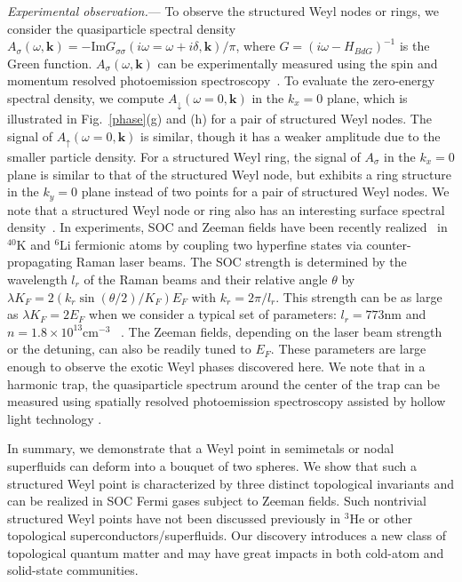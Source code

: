 \documentclass[prl,aps,twocolumn,showpacs,floatfix]{revtex4}
\begin{document}
\emph{Experimental observation.}--- To observe the structured Weyl nodes or
rings, we consider the quasiparticle spectral density $A_{\sigma }(\omega ,%
\bm{k})=-\mathrm{Im}G_{\sigma \sigma }(i\omega =\omega +i\delta ,\bm{k})/\pi
$, where $G=(i\omega -H_{BdG})^{-1}$ is the Green function. $A_{\sigma
}(\omega ,\bm{k})$ can be experimentally measured using the spin and
momentum resolved photoemission spectroscopy~\cite{Jin08Nature}. To evaluate
the zero-energy spectral density, we compute $A_{\downarrow }(\omega =0,%
\bm{k})$ in the $k_{x}=0$ plane, which is illustrated in Fig.~\ref{phase}(g)
and (h) for a pair of structured Weyl nodes. The signal of $A_{\uparrow
}(\omega =0,\bm{k})$ is similar, though it has a weaker amplitude due to the
smaller particle density. For a structured Weyl ring, the signal of $%
A_{\sigma }$ in the $k_{x}=0$ plane is similar to that of the structured
Weyl node, but exhibits a ring structure in the $k_{y}=0$ plane instead of
two points for a pair of structured Weyl nodes. We note that a structured
Weyl node or ring also has an interesting surface spectral density~\cite%
{Yang2014PRL}. In experiments, SOC and Zeeman fields have been recently
realized~\cite{Lin2011Nature,Jing2012PRL,
Zwierlen2012PRL,PanJian2012PRL,Qu2013PRA,Spilman2013PRL,
Spilman2013NatRev,Jing2014Review,Jing2015arXiv} in $^{40}$K and $^{6}$Li
fermionic atoms by coupling two hyperfine states via counter-propagating
Raman laser beams. The SOC strength is determined by the wavelength $l_{r}$
of the Raman beams and their relative angle $\theta $ by $\lambda
K_{F}=2(k_{r}\sin (\theta /2)/K_{F})E_{F}$ with $k_{r}=2\pi /l_{r}$. This
strength can be as large as $\lambda K_{F}=2E_{F}$ when we consider a
typical set of parameters: $l_{r}=773$nm and $n=1.8\times 10^{13}$cm$^{-3}$~%
\cite{Jing2012PRL}. The Zeeman fields, depending on the laser beam strength
or the detuning, can also be readily tuned to $E_{F}$. These parameters are
large enough to observe the exotic Weyl phases discovered here. We note that
in a harmonic trap, the quasiparticle spectrum around the center of the trap
can be measured using spatially resolved photoemission spectroscopy assisted
by hollow light technology \cite{GaeblerThesis}.

In summary, we demonstrate that a Weyl point in semimetals or nodal
superfluids can deform into a bouquet of two spheres. We show that such a
structured Weyl point is characterized by three distinct topological
invariants and can be realized in SOC Fermi gases subject to Zeeman fields.
Such nontrivial structured Weyl points have not been discussed previously in
$^{3}$He or other topological superconductors/superfluids. Our discovery
introduces a new class of topological quantum matter and may have great
impacts in both cold-atom and solid-state communities.
\end{document}
